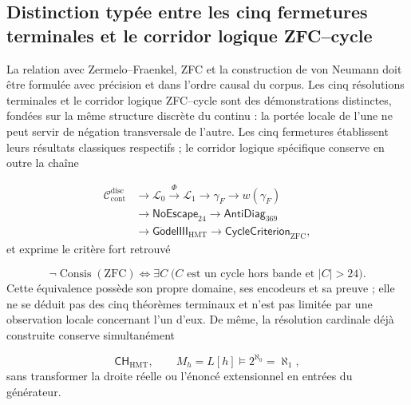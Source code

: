 \subsection{Distinction typée entre les cinq fermetures terminales et le corridor logique ZFC--cycle}
La relation avec Zermelo--Fraenkel, ZFC et la construction de von Neumann doit être formulée avec précision et dans l’ordre causal du corpus. Les cinq résolutions terminales et le corridor logique ZFC--cycle sont des démonstrations distinctes, fondées sur la même structure discrète du continu : la portée locale de l’une ne peut servir de négation transversale de l’autre. Les cinq fermetures établissent leurs résultats classiques respectifs ; le corridor logique spécifique conserve en outre la chaîne\par
\[
\begin{aligned}
 \mathcal C_{\mathrm{cont}}^{\mathrm{disc}}
 &\longrightarrow\mathcal L_0\xrightarrow{\Phi}\mathcal L_1
 \longrightarrow\gamma_F\longrightarrow w(\gamma_F)\\
 &\longrightarrow\mathsf{NoEscape}_{24}
 \longrightarrow\mathsf{AntiDiag}_{369}\\
 &\longrightarrow\mathsf{G\ddot{o}delIII}_{\mathrm{HMT}}
 \longrightarrow\mathsf{CycleCriterion}_{\mathrm{ZFC}},
\end{aligned}
\]
et exprime le critère fort retrouvé\par
\[
 \boxed{
 \neg\operatorname{Consis}(\mathrm{ZFC})
 \Longleftrightarrow
 \exists C\;\bigl(C\text{ est un cycle hors bande et }|C|>24\bigr).}
\]
Cette équivalence possède son propre domaine, ses encodeurs et sa preuve ; elle ne se déduit pas des cinq théorèmes terminaux et n’est pas limitée par une observation locale concernant l’un d’eux. De même, la résolution cardinale déjà construite conserve simultanément\par
\[
 \mathsf{CH}_{\mathrm{HMT}},
 \qquad
 M_h=L[h]\models 2^{\aleph_0}=\aleph_1,
\]
sans transformer la droite réelle ou l’énoncé extensionnel en entrées du générateur.\par

